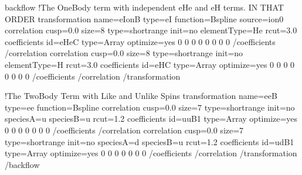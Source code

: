 \documentclass[letterpaper,10pt,english]{sphinxmanual}
\begin{document}
\begin{sphinxVerbatim}[commandchars=\\\{\}]
\PYGZlt{}backflow\PYGZgt{}
\PYGZlt{}!\PYGZhy{}\PYGZhy{}The One\PYGZhy{}Body term with independent e\PYGZhy{}He and e\PYGZhy{}H terms. IN THAT ORDER \PYGZhy{}\PYGZhy{}\PYGZgt{}
\PYGZlt{}transformation name=\PYGZdq{}eIonB\PYGZdq{} type=\PYGZdq{}e\PYGZhy{}I\PYGZdq{} function=\PYGZdq{}Bspline\PYGZdq{} source=\PYGZdq{}ion0\PYGZdq{}\PYGZgt{}
    \PYGZlt{}correlation cusp=\PYGZdq{}0.0\PYGZdq{} size=\PYGZdq{}8\PYGZdq{} type=\PYGZdq{}shortrange\PYGZdq{} init=\PYGZdq{}no\PYGZdq{} elementType=\PYGZdq{}He\PYGZdq{} rcut=\PYGZdq{}3.0\PYGZdq{}\PYGZgt{}
        \PYGZlt{}coefficients id=\PYGZdq{}eHeC\PYGZdq{} type=\PYGZdq{}Array\PYGZdq{} optimize=\PYGZdq{}yes\PYGZdq{}\PYGZgt{}
            0 0 0 0 0 0 0 0
        \PYGZlt{}/coefficients\PYGZgt{}
    \PYGZlt{}/correlation\PYGZgt{}
    \PYGZlt{}correlation cusp=\PYGZdq{}0.0\PYGZdq{} size=\PYGZdq{}8\PYGZdq{} type=\PYGZdq{}shortrange\PYGZdq{} init=\PYGZdq{}no\PYGZdq{} elementType=\PYGZdq{}H\PYGZdq{} rcut=\PYGZdq{}3.0\PYGZdq{}\PYGZgt{}
        \PYGZlt{}coefficients id=\PYGZdq{}eHC\PYGZdq{} type=\PYGZdq{}Array\PYGZdq{} optimize=\PYGZdq{}yes\PYGZdq{}\PYGZgt{}
            0 0 0 0 0 0 0 0
        \PYGZlt{}/coefficients\PYGZgt{}
    \PYGZlt{}/correlation\PYGZgt{}
\PYGZlt{}/transformation\PYGZgt{}

\PYGZlt{}!\PYGZhy{}\PYGZhy{}The Two\PYGZhy{}Body Term with Like and Unlike Spins \PYGZhy{}\PYGZhy{}\PYGZgt{}
\PYGZlt{}transformation name=\PYGZdq{}eeB\PYGZdq{} type=\PYGZdq{}e\PYGZhy{}e\PYGZdq{} function=\PYGZdq{}Bspline\PYGZdq{} \PYGZgt{}
    \PYGZlt{}correlation cusp=\PYGZdq{}0.0\PYGZdq{} size=\PYGZdq{}7\PYGZdq{} type=\PYGZdq{}shortrange\PYGZdq{} init=\PYGZdq{}no\PYGZdq{} speciesA=\PYGZdq{}u\PYGZdq{} speciesB=\PYGZdq{}u\PYGZdq{} rcut=\PYGZdq{}1.2\PYGZdq{}\PYGZgt{}
        \PYGZlt{}coefficients id=\PYGZdq{}uuB1\PYGZdq{} type=\PYGZdq{}Array\PYGZdq{} optimize=\PYGZdq{}yes\PYGZdq{}\PYGZgt{}
            0 0 0 0 0 0 0
        \PYGZlt{}/coefficients\PYGZgt{}
    \PYGZlt{}/correlation\PYGZgt{}
    \PYGZlt{}correlation cusp=\PYGZdq{}0.0\PYGZdq{} size=\PYGZdq{}7\PYGZdq{} type=\PYGZdq{}shortrange\PYGZdq{} init=\PYGZdq{}no\PYGZdq{} speciesA=\PYGZdq{}d\PYGZdq{} speciesB=\PYGZdq{}u\PYGZdq{} rcut=\PYGZdq{}1.2\PYGZdq{}\PYGZgt{}
        \PYGZlt{}coefficients id=\PYGZdq{}udB1\PYGZdq{} type=\PYGZdq{}Array\PYGZdq{} optimize=\PYGZdq{}yes\PYGZdq{}\PYGZgt{}
            0 0 0 0 0 0 0
        \PYGZlt{}/coefficients\PYGZgt{}
    \PYGZlt{}/correlation\PYGZgt{}
\PYGZlt{}/transformation\PYGZgt{}
\PYGZlt{}/backflow\PYGZgt{}
\end{sphinxVerbatim}
\end{document}
